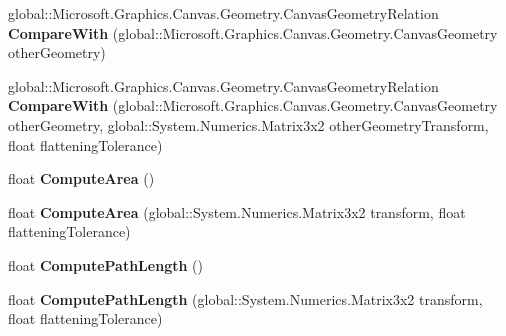 \begin{DoxyCompactItemize}
\item 
\mbox{\label{interface_microsoft_1_1_graphics_1_1_canvas_1_1_geometry_1_1_i_canvas_geometry_a2ccaa7f710d287e5e4dd8170deb5f559}} 
global\+::\+Microsoft.\+Graphics.\+Canvas.\+Geometry.\+Canvas\+Geometry\+Relation {\bfseries Compare\+With} (global\+::\+Microsoft.\+Graphics.\+Canvas.\+Geometry.\+Canvas\+Geometry other\+Geometry)
\item 
\mbox{\label{interface_microsoft_1_1_graphics_1_1_canvas_1_1_geometry_1_1_i_canvas_geometry_a05b0590f7526c5e62b664f3c73b3f28e}} 
global\+::\+Microsoft.\+Graphics.\+Canvas.\+Geometry.\+Canvas\+Geometry\+Relation {\bfseries Compare\+With} (global\+::\+Microsoft.\+Graphics.\+Canvas.\+Geometry.\+Canvas\+Geometry other\+Geometry, global\+::\+System.\+Numerics.\+Matrix3x2 other\+Geometry\+Transform, float flattening\+Tolerance)
\item 
\mbox{\label{interface_microsoft_1_1_graphics_1_1_canvas_1_1_geometry_1_1_i_canvas_geometry_a0f5c0e7cc934073f79ef8689581c700e}} 
float {\bfseries Compute\+Area} ()
\item 
\mbox{\label{interface_microsoft_1_1_graphics_1_1_canvas_1_1_geometry_1_1_i_canvas_geometry_abccc0c3b05f197af6abf2a494662b435}} 
float {\bfseries Compute\+Area} (global\+::\+System.\+Numerics.\+Matrix3x2 transform, float flattening\+Tolerance)
\item 
\mbox{\label{interface_microsoft_1_1_graphics_1_1_canvas_1_1_geometry_1_1_i_canvas_geometry_a7b9a9d62779c0ffb9edae6b37d603e83}} 
float {\bfseries Compute\+Path\+Length} ()
\item 
\mbox{\label{interface_microsoft_1_1_graphics_1_1_canvas_1_1_geometry_1_1_i_canvas_geometry_a86d3efebb758fbccdb757cae6bd3be83}} 
float {\bfseries Compute\+Path\+Length} (global\+::\+System.\+Numerics.\+Matrix3x2 transform, float flattening\+Tolerance)

\end{DoxyCompactItemize}
